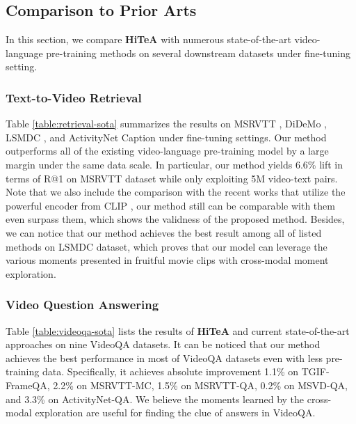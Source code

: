 \documentclass[10pt,twocolumn,letterpaper]{article}
\newcommand{\modelname}{\textbf{HiTeA}\xspace}
\begin{document}
\subsection{Comparison to Prior Arts}
In this section, we compare \modelname with numerous state-of-the-art video-language pre-training methods on several downstream datasets under fine-tuning setting. 

\subsubsection{Text-to-Video Retrieval}
Table \ref{table:retrieval-sota} summarizes the results on MSRVTT \cite{xu2016msrvtt}, DiDeMo \cite{anne2017didemo}, LSMDC \cite{rohrbach2015lsmdc}, and ActivityNet Caption \cite{krishna2017activitynetret} under fine-tuning settings. Our method outperforms all of the existing video-language pre-training model by a large margin under the same data scale. In particular, our method yields 6.6\% lift in terms of R@1 on MSRVTT dataset while only exploiting 5M video-text pairs. Note that we also include the comparison with the recent works that utilize the powerful encoder from CLIP \cite{radford2021clip}, our method still can be comparable with them even surpass them, which shows the validness of the proposed method. Besides, we can notice that our method achieves the best result among all of listed methods on LSMDC dataset, which proves that our model can leverage the various moments presented in fruitful movie clips with cross-modal moment exploration. 

\subsubsection{Video Question Answering}
Table \ref{table:videoqa-sota} lists the results of \modelname and current state-of-the-art approaches on nine VideoQA datasets. It can be noticed that our method achieves the best performance in most of VideoQA datasets even with less pre-training data. Specifically, it achieves absolute improvement 1.1\% on TGIF-FrameQA, 2.2\% on MSRVTT-MC, 1.5\% on MSRVTT-QA, 0.2\% on MSVD-QA, and 3.3\% on ActivityNet-QA. We believe the moments learned by the cross-modal exploration are useful for finding the clue of answers in VideoQA.

\vspace{-2ex}
\end{document}
